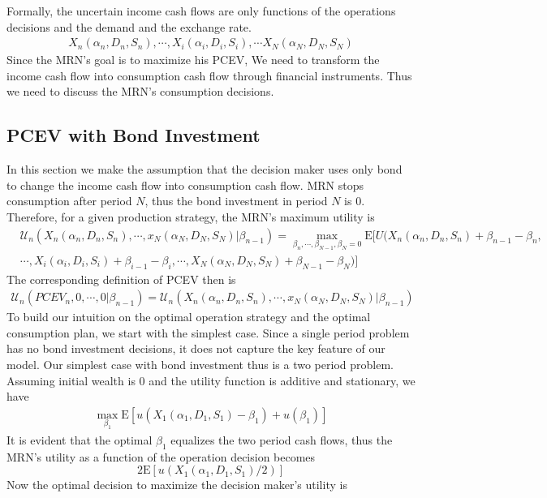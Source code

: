 \documentclass{article}[12pt letter]
\newcommand{\E}{\mathrm{E}}
\begin{document}
Formally, the uncertain income cash flows are only functions of the operations decisions and the demand and the exchange rate.
\begin{align}
X_n(\alpha_n, D_n,S_n), \cdots, X_i(\alpha_i, D_i,S_i), \cdots X_N(\alpha_N,D_N,S_N)
\end{align}
Since the MRN's goal is to maximize his PCEV, We need to transform the income cash flow into consumption cash flow through financial instruments. Thus we need to discuss the MRN's consumption decisions. 

\subsection{PCEV with Bond Investment}
In this section we make the assumption that the decision maker uses only bond to change the income cash flow into consumption cash flow. MRN stops consumption after period $N$, thus the bond investment in period $N$ is 0. Therefore, for a given production strategy, the MRN's maximum utility is
\begin{align}
& \mathcal{U}_n(X_n(\alpha_n, D_n,S_n), \cdots, x_N(\alpha_N,D_N,S_N)|\beta_{n-1}) =  \max_{\beta_n, \cdots, \beta_{N-1},\beta_N =0}\E[U(X_n(\alpha_n,D_n,S_n) +\beta_{n-1}-\beta_n, \nonumber \\
&\cdots, X_i(\alpha_i,D_i,S_i) + \beta_{i-1}-\beta_i, \cdots, X_N(\alpha_N,D_N,S_N)+\beta_{N-1} - \beta_{N} )]
\end{align} 
The corresponding definition of PCEV then is
\begin{align}
\mathcal{U}_n(PCEV_n, 0, \cdots, 0|\beta_{n-1} ) = \mathcal{U}_n(X_n(\alpha_n, D_n,S_n), \cdots, x_N(\alpha_N,D_N,S_N)|\beta_{n-1})
\end{align}
To build our intuition on the optimal operation strategy and the optimal consumption plan, we start with the simplest case. Since a single period problem has no bond investment decisions, it does not capture the key feature of our model. Our simplest case with bond investment thus is a two period problem. Assuming initial wealth is 0 and the utility function is additive and stationary, we have
\begin{align*}
\max_{\beta_1} \E[u(X_1(\alpha_1, D_1, S_1)-\beta_1) + u( \beta_1)]
\end{align*} 
It is evident that the optimal $\beta_1$ equalizes the two period cash flows, thus the MRN's utility as a function of the operation decision becomes
\[2\E [u(X_1(\alpha_1,D_1,S_1)/2)]\]
Now the optimal decision to maximize the decision maker's utility is
\end{document}
